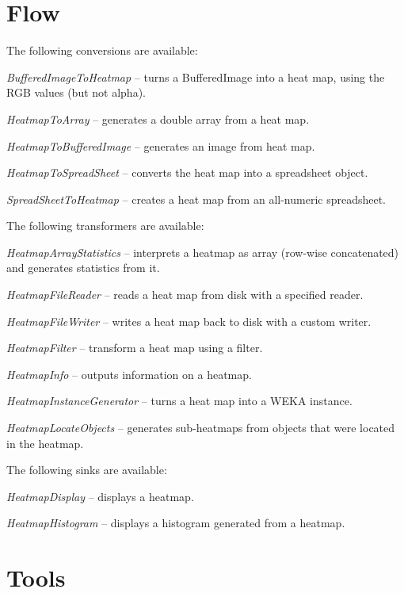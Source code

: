 \documentclass[a4paper]{book}
\begin{document}
\chapter{Flow}
The following conversions are available:
\begin{tight_itemize}
  	\item \textit{BufferedImageToHeatmap} -- turns a BufferedImage into a heat
  	map, using the RGB values (but not alpha).
  	\item \textit{HeatmapToArray} -- generates a double array from a heat map.
  	\item \textit{HeatmapToBufferedImage} -- generates an image from heat map.
  	\item \textit{HeatmapToSpreadSheet} -- converts the heat map into a 
  	spreadsheet object.
  	\item \textit{SpreadSheetToHeatmap} -- creates a heat map from an all-numeric
  	spreadsheet.
\end{tight_itemize}
The following transformers are available:
\begin{tight_itemize}
  	\item \textit{HeatmapArrayStatistics} -- interprets a heatmap as array
  	(row-wise concatenated) and generates statistics from it.
  	\item \textit{HeatmapFileReader} -- reads a heat map from disk with a
  	specified reader.
  	\item \textit{HeatmapFileWriter} -- writes a heat map back to disk with
  	a custom writer.
  	\item \textit{HeatmapFilter} -- transform a heat map using a filter.
  	\item \textit{HeatmapInfo} -- outputs information on a heatmap.
  	\item \textit{HeatmapInstanceGenerator} -- turns a heat map into a WEKA
  	instance.
  	\item \textit{HeatmapLocateObjects} -- generates sub-heatmaps from objects
  	that were located in the heatmap.
\end{tight_itemize}
The following sinks are available:
\begin{tight_itemize}
  	\item \textit{HeatmapDisplay} -- displays a heatmap.
  	\item \textit{HeatmapHistogram} -- displays a histogram generated from a heatmap.
\end{tight_itemize}

\chapter{Tools}
\end{document}

